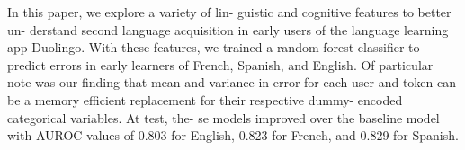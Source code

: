 In this paper, we explore a variety of lin- guistic and cognitive features to better un- derstand second language acquisition in early users of the language learning app Duolingo. With these features, we trained a random forest classifier to predict errors in early learners of French, Spanish, and English. Of particular note was our finding that mean and variance in error for each user and token can be a memory efficient replacement for their respective dummy- encoded categorical variables. At test, the- se models improved over the baseline model with AUROC values of 0.803 for English, 0.823 for French, and 0.829 for Spanish.
